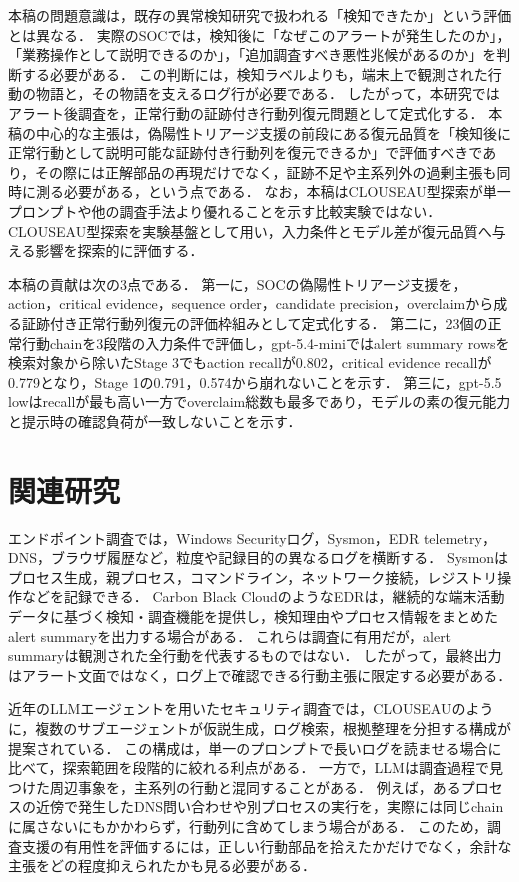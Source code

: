 \documentclass[a4paper,twocolumn,10pt]{article}
\newcommand{\code}[1]{{\small\ttfamily #1}}
\begin{document}
本稿の問題意識は，既存の異常検知研究で扱われる「検知できたか」という評価とは異なる．
実際のSOCでは，検知後に「なぜこのアラートが発生したのか」，「業務操作として説明できるのか」，「追加調査すべき悪性兆候があるのか」を判断する必要がある．
この判断には，検知ラベルよりも，端末上で観測された行動の物語と，その物語を支えるログ行が必要である．
したがって，本研究ではアラート後調査を，正常行動の証跡付き行動列復元問題として定式化する．
本稿の中心的な主張は，偽陽性トリアージ支援の前段にある復元品質を「検知後に正常行動として説明可能な証跡付き行動列を復元できるか」で評価すべきであり，その際には正解部品の再現だけでなく，証跡不足や主系列外の過剰主張も同時に測る必要がある，という点である．
なお，本稿はCLOUSEAU型探索が単一プロンプトや他の調査手法より優れることを示す比較実験ではない．
CLOUSEAU型探索を実験基盤として用い，入力条件とモデル差が復元品質へ与える影響を探索的に評価する．

本稿の貢献は次の3点である．
第一に，SOCの偽陽性トリアージ支援を，action，critical evidence，sequence order，candidate precision，overclaimから成る証跡付き正常行動列復元の評価枠組みとして定式化する．
第二に，23個の正常行動chainを3段階の入力条件で評価し，\code{gpt-5.4-mini}ではalert summary rowsを検索対象から除いたStage 3でもaction recallが0.802，critical evidence recallが0.779となり，Stage 1の0.791，0.574から崩れないことを示す．
第三に，\code{gpt-5.5 low}はrecallが最も高い一方でoverclaim総数も最多であり，モデルの素の復元能力と提示時の確認負荷が一致しないことを示す．

\section{関連研究}

エンドポイント調査では，Windows Securityログ，Sysmon，EDR telemetry，DNS，ブラウザ履歴など，粒度や記録目的の異なるログを横断する．
Sysmonはプロセス生成，親プロセス，コマンドライン，ネットワーク接続，レジストリ操作などを記録できる\cite{sysmon}．
Carbon Black CloudのようなEDRは，継続的な端末活動データに基づく検知・調査機能を提供し\cite{cbc}，検知理由やプロセス情報をまとめたalert summaryを出力する場合がある．
これらは調査に有用だが，alert summaryは観測された全行動を代表するものではない．
したがって，最終出力はアラート文面ではなく，ログ上で確認できる行動主張に限定する必要がある．

近年のLLMエージェントを用いたセキュリティ調査では，CLOUSEAU\cite{clouseau}のように，複数のサブエージェントが仮説生成，ログ検索，根拠整理を分担する構成が提案されている．
この構成は，単一のプロンプトで長いログを読ませる場合に比べて，探索範囲を段階的に絞れる利点がある．
一方で，LLMは調査過程で見つけた周辺事象を，主系列の行動と混同することがある．
例えば，あるプロセスの近傍で発生したDNS問い合わせや別プロセスの実行を，実際には同じchainに属さないにもかかわらず，行動列に含めてしまう場合がある．
このため，調査支援の有用性を評価するには，正しい行動部品を拾えたかだけでなく，余計な主張をどの程度抑えられたかも見る必要がある．
\end{document}
